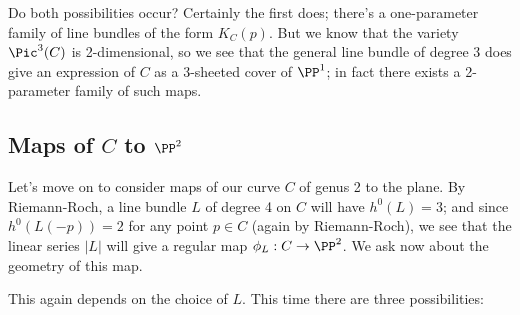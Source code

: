 Do both possibilities occur? Certainly the first does; there's a one-parameter family of line bundles of the form $K_C(p)$. But we know that the variety $\Pic^3(C)$ is 2-dimensional, so we see that the general line bundle of degree 3 does  give an expression of $C$ as a 3-sheeted cover of $\PP^1$; in fact there exists a 2-parameter family of such maps.

\subsection{Maps of $C$ to $\PP^2$} Let's move on to consider maps of our curve $C$ of genus 2 to the plane. By Riemann-Roch, a line bundle $L$ of degree 4 on $C$ will have $h^0(L) = 3$; and since $h^0(L(-p)) = 2$ for any point $p \in C$ (again by Riemann-Roch), we see that the linear series $|L|$ will give a regular map $\phi_L : C \to \PP^2$. We ask now about the geometry of this map.

This again depends on the choice of $L$. This time there are three possibilities:

